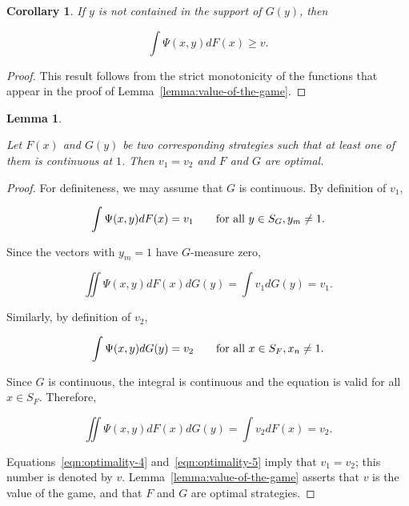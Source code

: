 \documentclass{article}
\newtheorem{corollary}{Corollary}
\newtheorem{lemma}{Lemma}
\theoremstyle{remark}
\begin{document}
\begin{corollary}

If $y$ is not contained in the support of $G(y)$, then

\[
\int \Psi(x, y) dF(x) \geq v.
\]

\end{corollary}

\begin{proof}

This result follows from the strict monotonicity of the functions that appear
in the proof of Lemma~\ref{lemma:value-of-the-game}.

\end{proof}

\begin{lemma} \label{lemma:optimality-of-corresponding-strategies}

Let $F(x)$ and $G(y)$ be two corresponding strategies such that at least one of
them is continuous at $1$. Then $v_1 = v_2$ and $F$ and $G$ are optimal.

\end{lemma}

\begin{proof}

For definiteness, we may assume that $G$ is continuous. By definition of $v_1$,

\[
\int \Psi(x, y) dF(x) = v_1 \qquad \textup{for all } y \in S_G, y_m \neq 1.
\]

Since the vectors with $y_m = 1$ have $G$-measure zero,

\begin{equation}
\iint \Psi(x, y) dF(x) dG(y) = \int v_1 dG(y) = v_1.  \label{eqn:optimality-4}
\end{equation}

Similarly, by definition of $v_2$,

\[
\int \Psi(x, y) dG(y) = v_2 \qquad \textup{for all } x \in S_F, x_n \neq 1.
\]

Since $G$ is continuous, the integral is continuous and the equation is valid
for all $x \in S_F$. Therefore,

\begin{equation}
\iint \Psi(x, y) dF(x) dG(y) = \int v_2 dF(x) = v_2.  \label{eqn:optimality-5}
\end{equation}

Equations~\ref{eqn:optimality-4} and~\ref{eqn:optimality-5} imply that $v_1 =
v_2$; this number is denoted by $v$. Lemma~\ref{lemma:value-of-the-game}
asserts that $v$ is the value of the game, and that $F$ and $G$ are optimal
strategies.

\end{proof}
\end{document}
